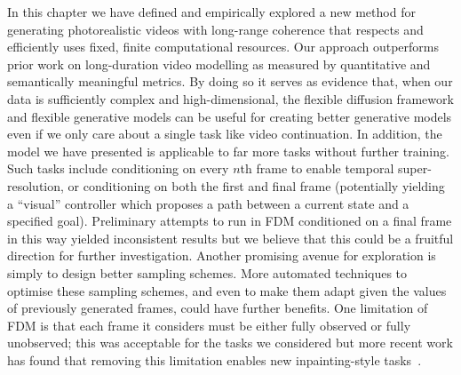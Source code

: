 In this chapter we have defined and empirically explored a new method for generating photorealistic videos with long-range coherence that respects and efficiently uses fixed, finite computational resources.
Our approach outperforms prior work on long-duration video modelling as measured by quantitative and semantically meaningful metrics. By doing so it serves as evidence that, when our data is sufficiently complex and high-dimensional, the flexible diffusion framework and flexible generative models can be useful for creating better generative models even if we only care about a single task like video continuation. In addition, the model we have presented is applicable to far more tasks without further training. Such tasks include conditioning on every $n$th frame to enable temporal super-resolution, or conditioning on both the first and final frame (potentially yielding a ``visual'' controller which proposes a path between a current state and a specified goal). Preliminary attempts to run in FDM conditioned on a final frame in this way yielded inconsistent results but we believe that this could be a fruitful direction for further investigation. Another promising avenue for exploration is simply to design better sampling schemes. More automated techniques to optimise these sampling schemes, and even to make them adapt given the values of previously generated frames, could have further benefits. One limitation of FDM is that each frame it considers must be either fully observed or fully unobserved; this was acceptable for the tasks we considered but more recent work has found that removing this limitation enables new inpainting-style tasks~\citep{green2024semantically}.
